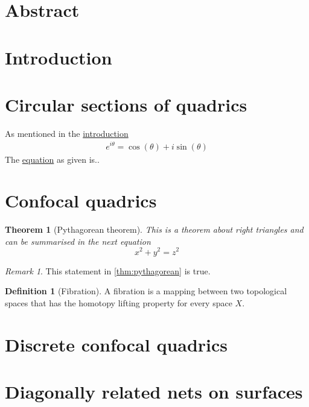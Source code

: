 \documentclass[12pt,a4paper]{article}
\newtheorem{theorem}{Theorem}[section]
\theoremstyle{definition}
\newtheorem{definition}{Definition}[section]
\theoremstyle{remark}
\newtheorem*{remark}{Remark}
\begin{document}
\section*{Abstract}
\pagebreak
\section{Introduction} \label{sec:introduction}
\pagebreak
\section{Circular sections of quadrics}
As mentioned in the \hyperref[sec:introduction]{introduction}
\begin{align} \label{eq:Euler}
    e^{i \theta} = \cos(\theta)+i\sin(\theta)
\end{align}
The \hyperref[eq:Euler]{equation} as given is..
\pagebreak
\section{Confocal quadrics}
\begin{theorem}[Pythagorean theorem]
\label{thm:pythagorean}
This is a theorem about right triangles and can be summarised in the next
equation
\[ x^2 + y^2 = z^2 \]
\end{theorem}
\begin{remark}
This statement in \autoref{thm:pythagorean} is true.
\end{remark}

\begin{definition}[Fibration]
\label{def:fibration}
A fibration is a mapping between two topological spaces that has the homotopy lifting property for every space \(X\).
\end{definition}
\pagebreak
\section{Discrete confocal quadrics}
\pagebreak
\section{Diagonally related nets on surfaces}
\pagebreak
\end{document}
